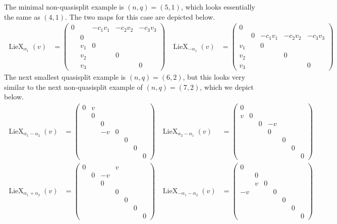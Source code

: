 \documentclass[12pt]{article}
\theoremstyle{definition}
\numberwithin{theorem}{subsection}
\DeclareMathOperator{\LieX}{LieX}
\begin{document}
The minimal non-quasisplit example is $(n,q) = (5,1)$, which looks essentially the same as $(4,1)$. The two maps for this case are depicted below.
\begin{align*}
	\LieX_{\alpha_1}(v) &= 
	\begin{pmatrix}
		0 && -c_1 v_1 & -c_2 v_2 & -c_3 v_3 \\
		& 0 \\
		& v_1 & 0 \\
		& v_2 && 0 \\
		& v_3 &&& 0
	\end{pmatrix}
	&
	\LieX_{-\alpha_1}(v) &=
	\begin{pmatrix}
		0  \\
		& 0 & -c_1 v_1 & -c_2 v_2 & -c_3 v_3 \\
		v_1 && 0 \\
		v_2 &&& 0  \\
		v_3 &&&& 0
	\end{pmatrix}
\end{align*}
The next smallest quasisplit example is $(n,q) = (6,2)$, but this looks very similar to the next non-quasisplit example of $(n,q) = (7,2)$, which we depict below.
\begin{align*}
	\LieX_{\alpha_1-\alpha_2}(v) &=
	\begin{pmatrix}
		0 & v \\
		& 0 \\
		&& 0 \\
		&& -v & 0 \\
		&& && 0 \\
		&&  &&& 0 \\
		&& &&&& 0
	\end{pmatrix} &
	\LieX_{\alpha_2-\alpha_1}(v) &=
	\begin{pmatrix}
		0  \\
		v & 0 \\
		&& 0 & -v \\
		&& & 0 \\
		&& && 0 \\
		&&  &&& 0 \\
		&& &&&& 0
	\end{pmatrix} \\
	\LieX_{\alpha_1+\alpha_2}(v) &=
	\begin{pmatrix}
		0 &&& v \\
		& 0 & -v \\
		&& 0 \\
		&&& 0 \\
		&& && 0 \\
		&&  &&& 0 \\
		&& &&&& 0
	\end{pmatrix} &
	\LieX_{-\alpha_1-\alpha_2}(v) &=
	\begin{pmatrix}
		0 \\
		& 0 \\
		& v & 0 \\
		-v &&& 0 \\
		&& && 0 \\
		&&  &&& 0 \\
		&& &&&& 0
	\end{pmatrix}
\end{align*}
\end{document}
